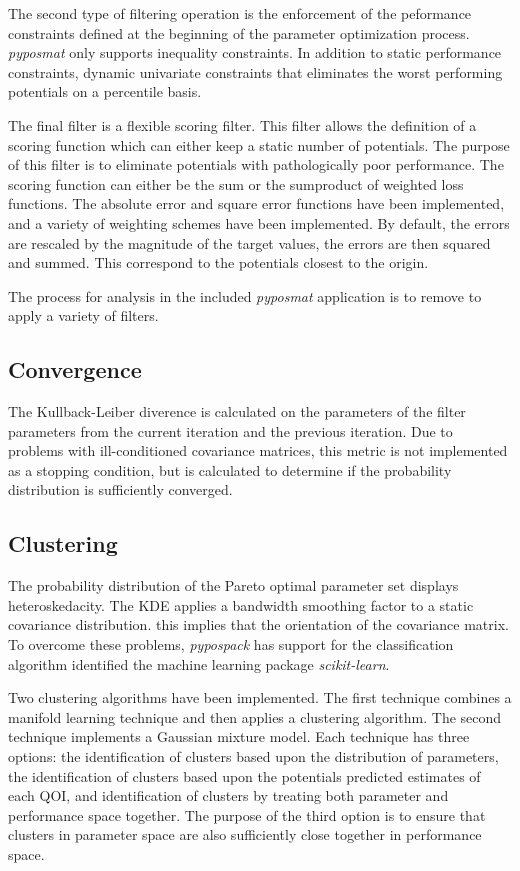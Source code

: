 The second type of filtering operation is the enforcement of the peformance constraints defined at the beginning of the parameter optimization process.  \emph{pyposmat} only supports inequality constraints.  In addition to static performance constraints, dynamic univariate constraints that eliminates the worst performing potentials on a percentile basis.

The final filter is a flexible scoring filter.  This filter allows the definition of a scoring function which can either keep a static number of potentials.  The purpose of this filter is to eliminate potentials with pathologically poor performance.  The scoring function can either be the sum or the sumproduct of weighted loss functions.  The absolute error and square error functions have been implemented, and a variety of weighting schemes have been implemented.  By default, the errors are rescaled by the magnitude of the target values, the errors are then squared and summed.  This correspond to the potentials closest to the origin.

The process for analysis in the included \emph{pyposmat} application is to remove to apply a variety of filters.

\subsection{Convergence}

The Kullback-Leiber diverence is calculated on the parameters of the filter parameters from the current iteration and the previous iteration.  Due to problems with ill-conditioned covariance matrices, this metric is not implemented as a stopping condition, but is calculated to determine if the probability distribution is sufficiently converged.

\subsection{Clustering}

The probability distribution of the Pareto optimal parameter set displays heteroskedacity.  The KDE applies a bandwidth smoothing factor to a static covariance distribution. this implies that the orientation of the covariance matrix.  To overcome these problems, \emph{pypospack} has support for the classification algorithm identified the machine learning package \emph{scikit-learn}.

Two clustering algorithms have been implemented.  The first technique combines a manifold learning technique and then applies a clustering algorithm.  The second technique implements a Gaussian mixture model.  Each technique has three options: the identification of  clusters based upon the distribution of parameters, the identification of clusters based upon the potentials predicted estimates of each QOI, and identification of clusters by treating both parameter and performance space together.  The purpose of the third option is to ensure that clusters in parameter space are also sufficiently close together in performance space.

